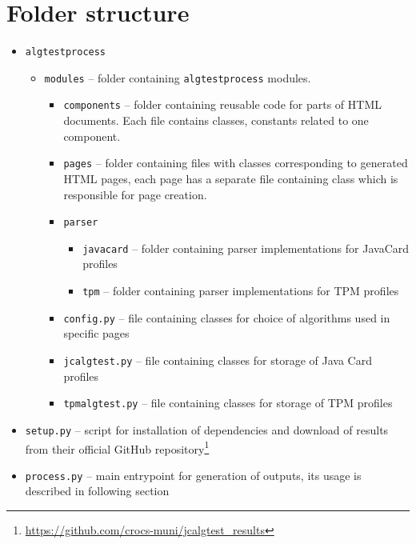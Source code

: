 \section{Folder structure}
\begin{itemize}
    \item \texttt{algtestprocess}
        \begin{itemize}
            \item \texttt{modules} -- folder containing \texttt{algtestprocess} modules.
                \begin{itemize}
                    \item \texttt{components} -- folder containing reusable code for parts of HTML documents. Each file contains classes, constants related to one component.
                    \item \texttt{pages} -- folder containing files with classes corresponding to generated HTML pages, each page has a separate file containing class which is responsible for page creation.
                    \item \texttt{parser}
                        \begin{itemize}
                            \item \texttt{javacard} -- folder containing parser implementations for JavaCard profiles
                            \item \texttt{tpm} -- folder containing parser implementations for TPM profiles
                        \end{itemize}
                    \item \texttt{config.py} -- file containing classes for choice of algorithms used in specific pages
                    \item \texttt{jcalgtest.py} -- file containing classes for storage of Java Card profiles
                    \item \texttt{tpmalgtest.py} -- file containing classes for storage of TPM profiles
                \end{itemize}
        \end{itemize}
    \item \texttt{setup.py} -- script for installation of dependencies and download of results from their official GitHub repository\footnote{\url{https://github.com/crocs-muni/jcalgtest_results}}
    \item \texttt{process.py} -- main entrypoint for generation of outputs, its usage is described in following section
\end{itemize}

